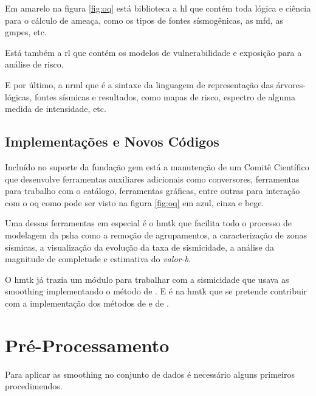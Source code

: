 Em amarelo na figura \ref{fig:oq} está biblioteca a \gls{hl} que contém toda lógica e ciência para o cálculo de ameaça,
como os tipos de fontes sísmogênicas, as \gls{mfd}, as \glspl{gmpe}, etc. 

Está também a \gls{rl}
que contém os modelos de vulnerabilidade e exposição para a análise de risco. 

E por último,
a \gls{nrml} que é a sintaxe da linguagem de representação das árvores-lógicas, fontes sísmicas e
resultados, como mapas de risco, espectro de alguma medida de intensidade, etc. 


\subsection{Implementações e Novos Códigos}
\label{sec:implementacao}

Incluído no suporte da fundação \gls{gem} está a manutenção de um Comitê Científico
que desenvolve ferramentas auxiliares adicionais como conversores, ferramentas para trabalho com 
o catálogo, ferramentas gráficas, entre outras para interação com o
\gls{oq} como pode ser visto na figura \ref{fig:oq} em azul, cinza e bege.

Uma dessas ferramentas em especial é o \gls{hmtk} \citep{weatherill_2012, weatherill_2014-1} que facilita todo o
processo de modelagem da \gls{psha} como a remoção de agrupamentos, a caracterização de zonas sísmicas,  
a visualização da evolução da taxa de sismicidade, a análise da magnitude de completude e
estimativa do \emph{valor-b}.

O \gls{hmtk} já trazia um módulo para trabalhar com a sismicidade que usava as \gls{smoothing}
implementando o método de \citet{frankel_1995}. E é na \gls{hmtk} que se pretende
contribuir com a implementação dos métodos de \citet{woo_1996} e de \citet{helmstetter_2012}.
 
\section{Pré-Processamento}
\label{sec:pre_processamento}

Para aplicar as \gls{smoothing} no conjunto de dados é necessário alguns primeiros procedimendos.


